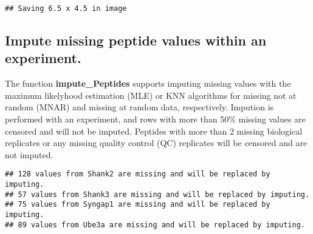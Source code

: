 \documentclass[]{article}
\newenvironment{Shaded}{\begin{snugshade}}{\end{snugshade}}
\newcommand{\KeywordTok}[1]{\textcolor[rgb]{0.13,0.29,0.53}{\textbf{#1}}}
\newcommand{\DataTypeTok}[1]{\textcolor[rgb]{0.13,0.29,0.53}{#1}}
\newcommand{\StringTok}[1]{\textcolor[rgb]{0.31,0.60,0.02}{#1}}
\newcommand{\CommentTok}[1]{\textcolor[rgb]{0.56,0.35,0.01}{\textit{#1}}}
\newcommand{\NormalTok}[1]{#1}
\begin{document}
\begin{verbatim}
## Saving 6.5 x 4.5 in image
\end{verbatim}

\subsection{Impute missing peptide values within an
experiment.}\label{impute-missing-peptide-values-within-an-experiment.}

The function \textbf{impute\_Peptides} supports imputing missing values
with the maximum likelyhood estimation (MLE) or KNN algorithms for
missing not at random (MNAR) and missing at random data, respectively.
Impution is performed with an experiment, and rows with more than 50\%
missing values are censored and will not be imputed. Peptides with more
than 2 missing biological replicates or any missing quality control (QC)
replicates will be censored and are not imputed.

\begin{Shaded}
\end{Shaded}

\begin{verbatim}
## 128 values from Shank2 are missing and will be replaced by imputing.
## 57 values from Shank3 are missing and will be replaced by imputing.
## 75 values from Syngap1 are missing and will be replaced by imputing.
## 89 values from Ube3a are missing and will be replaced by imputing.
\end{verbatim}
\end{document}
